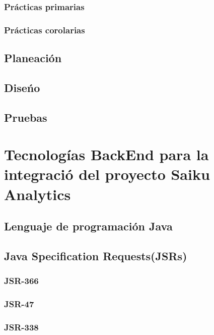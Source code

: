 \begin{spacing}{1.5}
		\subsubsection{Pr\'{a}cticas primarias}
					\lipsum[1]
		\subsubsection{Pr\'{a}cticas corolarias}
					\lipsum[1]
	\subsection{Planeaci\'{o}n}
				\lipsum[1]
	\subsection{Dise\'{n}o}
				\lipsum[1]
	\subsection{Pruebas}
				\lipsum[1]
\section{Tecnolog\'{i}as BackEnd para la integraci\'{o} del proyecto Saiku Analytics}
		\lipsum[1-2]
	\subsection{Lenguaje de programaci\'{o}n Java}
			\lipsum[1-2]
	\subsection{Java Specification Requests(JSRs)}
		\subsubsection{JSR-366}
				\lipsum[1-2]
		\subsubsection{JSR-47}
				\lipsum[1-2]
		\subsubsection{JSR-338}
				\lipsum[1-2]

\end{spacing}
